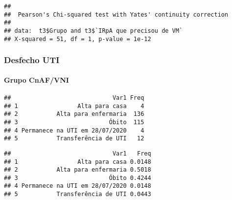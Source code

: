 \documentclass[
]{article}
\newenvironment{Shaded}{\begin{snugshade}}{\end{snugshade}}
\newcommand{\AttributeTok}[1]{\textcolor[rgb]{0.77,0.63,0.00}{#1}}
\newcommand{\FunctionTok}[1]{\textcolor[rgb]{0.00,0.00,0.00}{#1}}
\newcommand{\NormalTok}[1]{#1}
\newcommand{\SpecialCharTok}[1]{\textcolor[rgb]{0.00,0.00,0.00}{#1}}
\newcommand{\StringTok}[1]{\textcolor[rgb]{0.31,0.60,0.02}{#1}}
\begin{document}
\begin{verbatim}
## 
##  Pearson's Chi-squared test with Yates' continuity correction
## 
## data:  t3$Grupo and t3$`IRpA que precisou de VM`
## X-squared = 51, df = 1, p-value = 1e-12
\end{verbatim}

\hypertarget{desfecho-uti}{%
\subsubsection{\texorpdfstring{\textbf{Desfecho
UTI}}{Desfecho UTI}}\label{desfecho-uti}}

\hypertarget{grupo-cnafvni-5}{%
\paragraph{\texorpdfstring{\textbf{Grupo
CnAF/VNI}}{Grupo CnAF/VNI}}\label{grupo-cnafvni-5}}

\begin{Shaded}
\end{Shaded}

\begin{verbatim}
##                             Var1 Freq
## 1                 Alta para casa    4
## 2           Alta para enfermaria  136
## 3                          Óbito  115
## 4 Permanece na UTI em 28/07/2020    4
## 5           Transferência de UTI   12
\end{verbatim}

\begin{Shaded}
\end{Shaded}

\begin{verbatim}
##                             Var1   Freq
## 1                 Alta para casa 0.0148
## 2           Alta para enfermaria 0.5018
## 3                          Óbito 0.4244
## 4 Permanece na UTI em 28/07/2020 0.0148
## 5           Transferência de UTI 0.0443
\end{verbatim}
\end{document}
